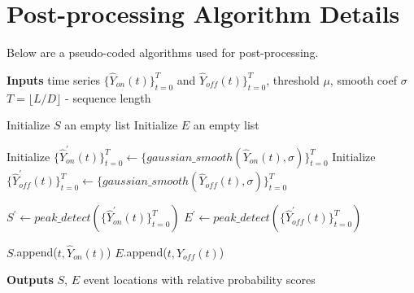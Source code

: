 \documentclass{article}
\begin{document}
\section{Post-processing Algorithm Details}
\label{appendix:algos}

Below are a pseudo-coded algorithms used for post-processing.

\begin{algorithm*}[ht]
\caption{Regression Post-Processing Procedure}
\hspace*{\algorithmicindent} \textbf{Inputs} time series $\{\hat{Y}_{on}(t)\}_{t=0}^T$ and $\hat{Y}_{off}(t)\}_{t=0}^T$, threshold $\mu$, smooth coef $\sigma$ \\ 
\hspace*{50pt} $T = \lfloor L/D \rfloor$ - sequence length
\begin{algorithmic}[1]
    \State Initialize $S$ an empty list 
    \State Initialize $E$ an empty list 

    \State Initialize $\{\hat{Y}_{on}^\prime(t)\}_{t=0}^T \leftarrow \{gaussian\_smooth(\hat{Y}_{on}(t),\sigma)\}_{t=0}^T$ 
    \State Initialize $\{\hat{Y}_{off}^\prime(t)\}_{t=0}^T \leftarrow \{gaussian\_smooth(\hat{Y}_{off}(t),\sigma)\}_{t=0}^T$ 
    
    \State $ S^\prime \leftarrow peak\_detect(\{\hat{Y}_{on}^\prime(t)\}_{t=0}^T)$
    \State $ E^\prime \leftarrow peak\_detect(\{\hat{Y}_{off}^\prime(t)\}_{t=0}^T)$

        \State $S$.append($t, \hat{Y}_{on}(t)$)
    \EndFor
        \State $E$.append($t, \hat{Y}_{off}(t)$)
    \EndFor
    \EndProcedure
\end{algorithmic}
\hspace*{\algorithmicindent} \textbf{Outputs} $S$, $E$ event locations with relative probability scores
\end{algorithm*}
\end{document}
